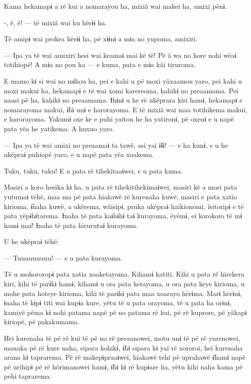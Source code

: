 Kama hekamapɨ a rë kui a nomarayou ha, mixiã wai makei ha, amixi pënɨ. 

-, ẽ, ẽ! --- të mixiã wai ku hërɨɨ ha. 

Të amipɨ wai prokea hërɨɨ ha, pë xɨɨnɨ a mɨa no yupoma, amixiri. 

— Ipa ya të wai amixiri hesi wai keamaɨ mai kë të! Pë ã wa no hore nohi
wëaɨ totihiopë! A mɨa no pou ha --- e kuma, pata e mɨa kãi tiruroma. 

E mamo kɨ si wai no mɨhou ha, pei e kahi u pë moxi yãxaamou yaro, pei
kahi u moxi makui ha, hekamapɨ e të wai xomi karereoma, kahikɨ no
preaamama. Pei naasi pë ha, kahikɨ no preaamama. Ɨhɨnɨ u he rë ukëprara
kiri hamɨ, hekamapɨ e nomarayoma makui, ɨ̃hɨ unɨ e harorayoma. E të mixiã
wai maa totihikema makui, e harorayoma. Yakumɨ oxe ke e puhi yaitou he
ha yatironɨ, pë oxenɨ e u napë pata yëa he yatikema. A huxuo yaro. 

— Ipa ya të wai amixi no preaamaɨ ta tawë, asi yai ɨ̃ɨɨ! --- e ha kunɨ, e
u he ukëpraɨ puhiopë yaro, e u napë pata yëa xoakema. 

Tuku, tuku, tuku! E u pata rë tihekitaaɨwei, e u pata kuma. 

Masiri a koro hesika kɨ ha, u pata rë tihekitihekimaɨwei, masiri kë a
mori pata yutumaɨ tëhë, maa ma pë pata hiakawë rë kurenaha kuwë, masiri
e pata xatio kirioma, ɨ̃naha kuwë, a ukërema, wãisipɨ, pruka ukëpraɨ
haikionomi, ĩsitoripɨ e të pata yëpɨhɨtarema. Ɨnaha të pata kaɨhɨhɨ taɨ
kurayoma, ëyëmɨ, ei korokoro të mɨ hamɨ mai! Ɨnaha të pata hirurutaɨ
kurayoma. 

U he ukëpraɨ tëhë: 

— Tuuuuuuuuu! --- e u pata kurayoma. 

Të u mohororopɨ pata xatia xoaketayoma. Kihamɨ katiti. Kihi u pata rë
hirekera kiri, kihi të parɨkɨ hamɨ, kihamɨ u ora pata kerayoma, u ora
pata keye kirioma, u mohe pata hoteye kirioma, kihi të parɨkɨ pata maa
xoarayo hërɨma. Marɨ hërɨnɨ, ɨnaha të kɨpɨ titi wai kupɨa kure, yëtu të
u pata orayoma, të u pata ha orɨnɨ, kamiyë pëma kɨ nohi patama napë pë
no patama rë kui, pë rë kuprore, pë yãkapɨ kiriopë, pë pakakumama. 

Hei kurenaha të pë rë kui të pë no rë preaanowei, motu unɨ të pë rë
yurenowei, manaka pë rë kure naha, sipara kohikɨ, ɨ̃hɨ sipara kɨ yai rë
xororoi, hei kurenaha arana kɨ taprarema. Pë rë makepɨpraaɨwei, hiakawë
tehi pë uprahawë ɨ̃hamɨ napë pë urihipɨ pë rë hõrimanowei hamɨ, ɨ̃hɨ kɨ rë
kupɨare ha, yëtu kihi naha kama pë pehi taprarema. 

